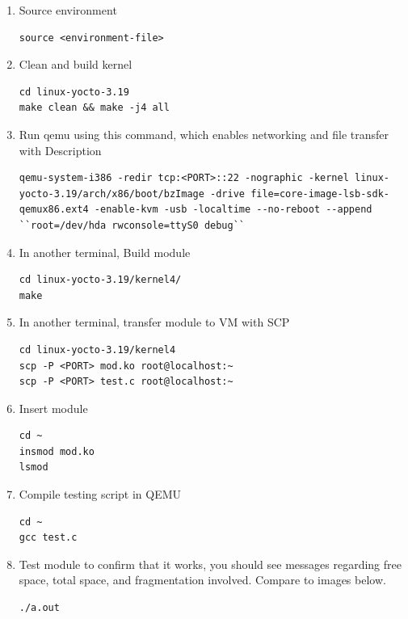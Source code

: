 \documentclass[onecolumn, draftclsnofoot,10pt, compsoc]{IEEEtran}
\begin{document}
	\begin{enumerate}

	\item Source environment
	\begin{lstlisting}
source <environment-file>
\end{lstlisting}

	\item Clean and build kernel
	\begin{lstlisting}
cd linux-yocto-3.19
make clean && make -j4 all
\end{lstlisting}

  \item Run qemu using this command, which enables networking and file transfer with Description
	\begin{lstlisting}
qemu-system-i386 -redir tcp:<PORT>::22 -nographic -kernel linux-yocto-3.19/arch/x86/boot/bzImage -drive file=core-image-lsb-sdk-qemux86.ext4 -enable-kvm -usb -localtime --no-reboot --append ``root=/dev/hda rwconsole=ttyS0 debug``
\end{lstlisting}

\item In another terminal, Build module
\begin{lstlisting}
cd linux-yocto-3.19/kernel4/
make
\end{lstlisting}

	\item In another terminal, transfer module to VM with SCP
	\begin{lstlisting}
cd linux-yocto-3.19/kernel4
scp -P <PORT> mod.ko root@localhost:~
scp -P <PORT> test.c root@localhost:~
\end{lstlisting}

	\item Insert module
	\begin{lstlisting}
cd ~
insmod mod.ko
lsmod
\end{lstlisting}

  \item Compile testing script in QEMU
  \begin{lstlisting}
cd ~
gcc test.c
\end{lstlisting}

  	\item Test module to confirm that it works, you should see messages regarding free space, total space, and fragmentation involved. Compare to images below.
  	\begin{lstlisting}
./a.out
\end{lstlisting}


\end{enumerate}
\end{document}
